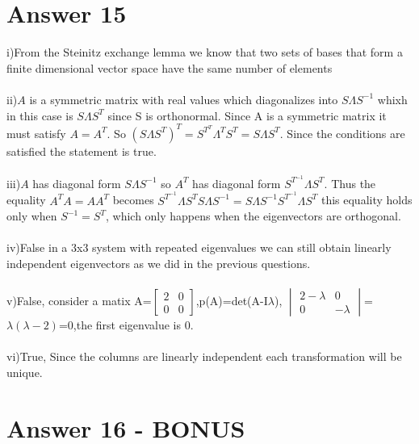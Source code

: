 \documentclass[12pt]{article}
\begin{document}
\section*{Answer 15}
i)From the Steinitz exchange lemma we know that two sets of bases that form a finite dimensional vector space have the same number of elements\\\\
ii)$A$ is a symmetric matrix with real values which diagonalizes into $S\Lambda S^{-1}$ whixh in this case is $S\Lambda S^{T}$ since S is orthonormal.
Since A is a symmetric matrix it must satisfy $A=A^{T}$. So $(S\Lambda S^{T})^{T}=S^{T^{T}}\Lambda^{T} S^{T}=S\Lambda S^{T}$. Since the conditions are satisfied the statement is true.\\\\
iii)$A$ has diagonal form $S\Lambda S^{-1}$ so $A^{T}$ has diagonal form $S^{T^{-1}}\Lambda S^{T}$. Thus the equality $A^{T}A=AA^{T}$ becomes $S^{T^{-1}}\Lambda S^{T}S\Lambda S^{-1}=S\Lambda S^{-1}S^{T^{-1}}\Lambda S^{T}$ this equality holds only when $S^{-1}=S^{T}$, which only happens when the eigenvectors are orthogonal.\\\\
iv)False in a 3x3 system with repeated eigenvalues we can still obtain linearly independent eigenvectors as we did in the previous questions.\\\\
v)False, consider a matix A=$\begin{bmatrix}
    2&0\\
    0&0
\end{bmatrix}$,p(A)=det(A-I$\lambda$),
$\begin{vmatrix}
    2-\lambda&0\\
    0&-\lambda
\end{vmatrix}$=$\lambda(\lambda-2)$=0,the first eigenvalue is 0.\\\\
vi)True, Since the columns are linearly independent each transformation will be unique.


\section*{Answer 16 - BONUS}
\end{document}
